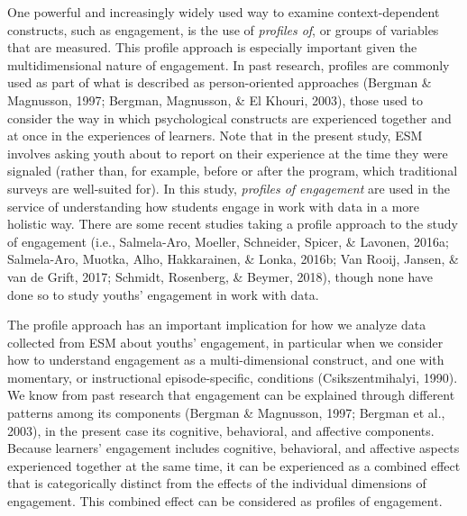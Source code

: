 \documentclass[]{msu-thesis}
\theoremstyle{definition}
\theoremstyle{definition}
\theoremstyle{definition}
\theoremstyle{remark}
\begin{document}
One powerful and increasingly widely used way to examine
context-dependent constructs, such as engagement, is the use of
\emph{profiles of}, or groups of variables that are measured. This
profile approach is especially important given the multidimensional
nature of engagement. In past research, profiles are commonly used as
part of what is described as person-oriented approaches (Bergman \&
Magnusson, 1997; Bergman, Magnusson, \& El Khouri, 2003), those used to
consider the way in which psychological constructs are experienced
together and at once in the experiences of learners. Note that in the
present study, ESM involves asking youth about to report on their
experience at the time they were signaled (rather than, for example,
before or after the program, which traditional surveys are well-suited
for). In this study, \emph{profiles of engagement} are used in the
service of understanding how students engage in work with data in a more
holistic way. There are some recent studies taking a profile approach to
the study of engagement (i.e., Salmela-Aro, Moeller, Schneider, Spicer,
\& Lavonen, 2016a; Salmela-Aro, Muotka, Alho, Hakkarainen, \& Lonka,
2016b; Van Rooij, Jansen, \& van de Grift, 2017; Schmidt, Rosenberg, \&
Beymer, 2018), though none have done so to study youths' engagement in
work with data.

The profile approach has an important implication for how we analyze
data collected from ESM about youths' engagement, in particular when we
consider how to understand engagement as a multi-dimensional construct,
and one with momentary, or instructional episode-specific, conditions
(Csikszentmihalyi, 1990). We know from past research that engagement can
be explained through different patterns among its components (Bergman \&
Magnusson, 1997; Bergman et al., 2003), in the present case its
cognitive, behavioral, and affective components. Because learners'
engagement includes cognitive, behavioral, and affective aspects
experienced together at the same time, it can be experienced as a
combined effect that is categorically distinct from the effects of the
individual dimensions of engagement. This combined effect can be
considered as profiles of engagement.
\end{document}
